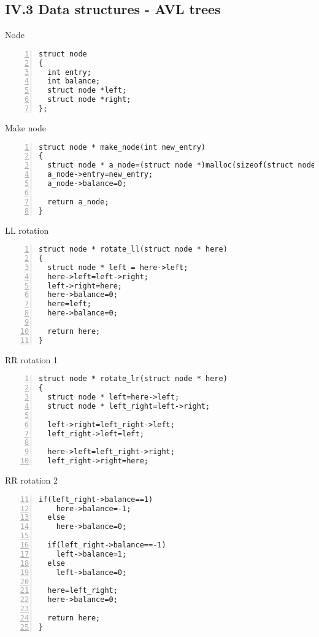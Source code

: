 \documentclass{beamer}
\begin{document}
\subsection*{IV.3 Data structures - AVL trees}
\begin{frame}[fragile]{Node}
\begin{lstlisting}[numbers=left]
struct node
{
  int entry;
  int balance;
  struct node *left;
  struct node *right;
};\end{lstlisting}
\end{frame}
\begin{frame}[fragile]{Make node}
\begin{lstlisting}[numbers=left]
struct node * make_node(int new_entry)
{
  struct node * a_node=(struct node *)malloc(sizeof(struct node));
  a_node->entry=new_entry;
  a_node->balance=0;

  return a_node;
}
\end{lstlisting}
\end{frame}
\begin{frame}[fragile]{LL rotation}
\begin{lstlisting}[numbers=left]
struct node * rotate_ll(struct node * here)
{
  struct node * left = here->left;
  here->left=left->right;
  left->right=here;
  here->balance=0;
  here=left;
  here->balance=0;

  return here;
}
\end{lstlisting}
\end{frame}
\begin{frame}[fragile]{RR rotation 1}
\begin{lstlisting}[numbers=left]
struct node * rotate_lr(struct node * here)
{
  struct node * left=here->left;
  struct node * left_right=left->right;

  left->right=left_right->left;
  left_right->left=left;

  here->left=left_right->right;
  left_right->right=here;
\end{lstlisting}
\end{frame}
\begin{frame}[fragile]{RR rotation 2}
\begin{lstlisting}[numbers=left, firstnumber=11]
  if(left_right->balance==1)
    here->balance=-1;
  else
    here->balance=0;
  
  if(left_right->balance==-1)
    left->balance=1;
  else
    left->balance=0;
		  
  here=left_right;
  here->balance=0;
  
  return here;
}
\end{lstlisting}
\end{frame}
\end{document}
